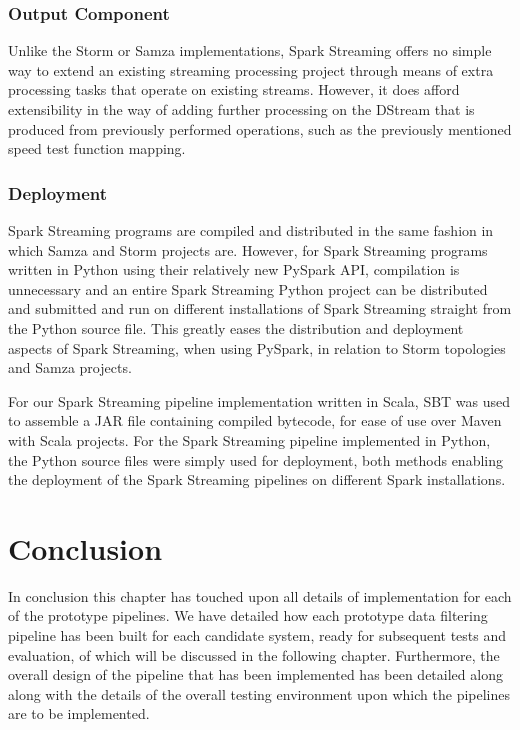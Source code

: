 \subsubsection{Output Component}

Unlike the Storm or Samza implementations, Spark Streaming offers no simple way to extend an existing streaming processing
project through means of extra processing tasks that operate on existing streams. However, it does afford extensibility
in the way of adding further processing on the DStream that is produced from previously performed operations, such
as the previously mentioned speed test function mapping.

\subsubsection{Deployment}

Spark Streaming programs are compiled and distributed in the same fashion in which Samza and Storm projects are. However,
for Spark Streaming programs written in Python using their relatively new PySpark API, compilation is unnecessary and an entire Spark
Streaming Python project can be distributed and submitted and run on different installations of Spark Streaming straight
from the Python source file. This greatly eases the distribution and deployment aspects of Spark Streaming, when using
PySpark, in relation to Storm topologies and Samza projects.

For our Spark Streaming pipeline implementation written in Scala, SBT was used to assemble a JAR file containing compiled
bytecode, for ease of use over Maven with Scala projects. For the Spark Streaming pipeline implemented in Python, the
Python source files were simply used for deployment, both methods enabling the deployment of the Spark Streaming pipelines on
different Spark installations.





\section{Conclusion} %
\label{sub:implement_conclusion}

In conclusion this chapter has touched upon all details of implementation for each of the prototype pipelines.
We have detailed how each prototype data filtering pipeline has been built for each candidate system, ready
for subsequent tests and evaluation, of which will be discussed in the following chapter. Furthermore, the overall
design of the pipeline that has been implemented has been detailed along along with the details of the overall testing
environment upon which the pipelines are to be implemented.


